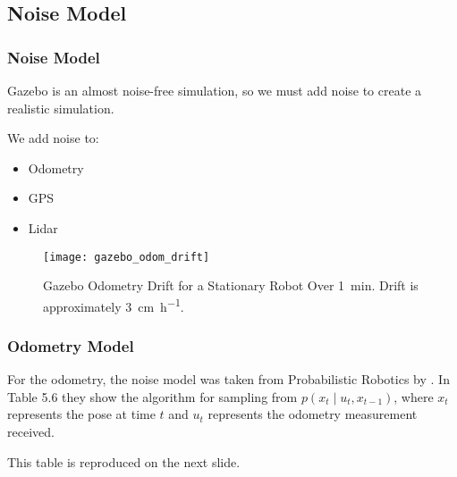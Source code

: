 \documentclass[14pt]{beamer}
\begin{document}
\subsection{Noise Model}
\begin{frame}
\frametitle{Noise Model}
Gazebo is an almost noise-free simulation, so we must add noise to create a realistic simulation.

\vspace{14pt}
We add noise to:
\begin{itemize}
\item Odometry
\item GPS
\item Lidar
\end{itemize}
\end{frame}

\begin{frame}
\begin{figure}
\texttt{[image: gazebo\_odom\_drift]}
\caption{Gazebo Odometry Drift for a Stationary Robot Over \SI{1}{\minute}. Drift is approximately \SI{3}{\cm\per\hour}.}
\label{fig:gazebo_odom_drfit}
\end{figure}
\end{frame}

\begin{frame}
\frametitle{Odometry Model}
For the odometry, the noise model was taken from Probabilistic Robotics by \textcite{ProbabilisticRobotics}. In Table 5.6 they show the algorithm for sampling from $p(x_t \mid u_t, x_{t-1})$, where $x_t$ represents the pose at time $t$ and $u_t$ represents the odometry measurement received.

\vspace{14pt}
This table is reproduced on the next slide.

\end{frame}
\end{document}
